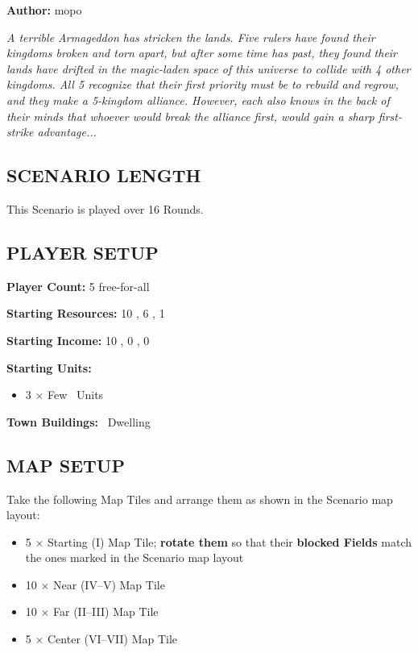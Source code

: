 
\begin{multicols}{2}

\textbf{Author:} mopo

\textit{A terrible Armageddon has stricken the lands. Five rulers have found their kingdoms broken and torn apart, but after some time has past, they found their lands have drifted in the magic-laden space of this universe to collide with 4 other kingdoms. All 5 recognize that their first priority must be to rebuild and regrow, and they make a 5-kingdom alliance. However, each also knows in the back of their minds that whoever would break the alliance first, would gain a sharp first-strike advantage...}

\subsection*{\MakeUppercase{Scenario Length}}
This Scenario is played over 16 Rounds.

\subsection*{\MakeUppercase{Player Setup}}
\textbf{Player Count:} 5 free-for-all

\textbf{Starting Resources:} 10 , 6 , 1 

\textbf{Starting Income:} 10 , 0 , 0 

\textbf{Starting Units:}
\begin{itemize}
  \item 3 × Few \bronze\ Units
\end{itemize}

\textbf{Town Buildings:} \bronze\ Dwelling

\subsection*{\MakeUppercase{Map Setup}}
Take the following Map Tiles and arrange them as shown in the Scenario map layout:

\begin{itemize}
  \item 5 × Starting (I) Map Tile; \textbf{rotate them} so that their \textbf{blocked Fields} match the ones marked in the Scenario map layout
  \item 10 × Near (IV--V) Map Tile
  \item 10 × Far (II--III) Map Tile
  \item 5 × Center (VI--VII) Map Tile
\end{itemize}


\end{multicols}
